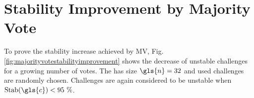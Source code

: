 
\section{Stability Improvement by Majority Vote}
\label{sec:stabilityimprovementbymajorityvote}

To prove the stability increase achieved by \ac{MV}, Fig. \ref{fig:majorityvotestabilityimprovement} shows the decrease of unstable challenges for a growing number of votes.
The \mpuf has size $\gls{n} = 32$ and used challenges are randomly chosen.
Challenges are again considered to be unstable when $\Stab(\gls{c}) < 95\ \%$.


